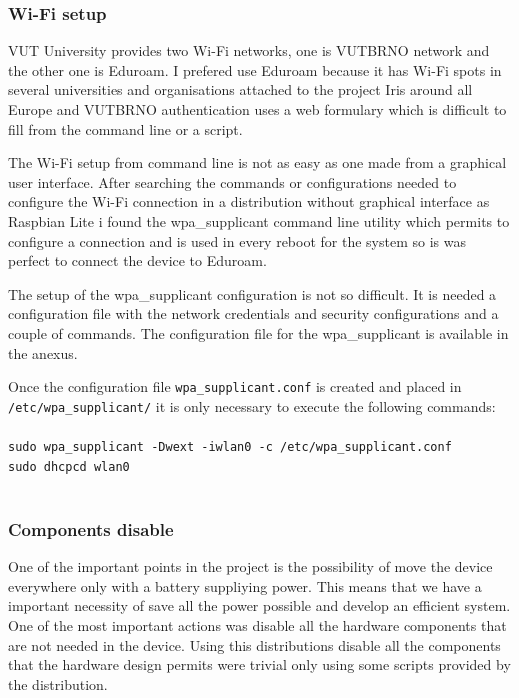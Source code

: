 			\subsubsection{Wi-Fi setup}
			VUT University provides two Wi-Fi networks, one is VUTBRNO network and the other one is Eduroam. I prefered use Eduroam because it has Wi-Fi spots in several universities and organisations attached to the project Iris around all Europe and VUTBRNO authentication uses a web formulary which is difficult to fill from the command line or a script.

			The Wi-Fi setup from command line is not as easy as one made from a graphical user interface. After searching the commands or configurations needed to configure the Wi-Fi connection in a distribution without graphical interface as Raspbian Lite i found the wpa\_supplicant command line utility which permits to configure a connection and is used in every reboot for the system so is was perfect to connect the device to Eduroam.

			The setup of the wpa\_supplicant configuration is not so difficult. It is needed a configuration file with the network credentials and security configurations and a couple of commands. The configuration file for the wpa\_supplicant is available in the anexus. %

			Once the configuration file \texttt{wpa\_supplicant.conf} is created and placed in \texttt{/etc/wpa\_supplicant/} it is only necessary to execute the following commands:\\\\
			\texttt{sudo wpa\_supplicant -Dwext -iwlan0 -c /etc/wpa\_supplicant.conf}\\
			\texttt{sudo dhcpcd wlan0}\\\\

			\subsubsection{Components disable}
			One of the important points in the project is the possibility of move the device everywhere only with a battery suppliying power. This means that we have a important necessity of save all the power possible and develop an efficient system. One of the most important actions was disable all the hardware components that are not needed in the device. Using this distributions disable all the components that the hardware design permits were trivial only using some scripts provided by the distribution.

